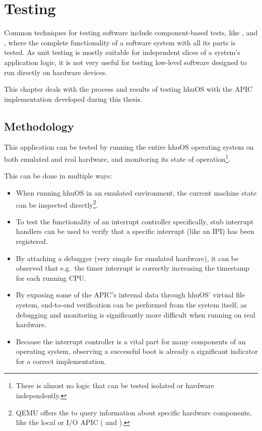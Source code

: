 \chapter{Testing}
\label{ch:verification}

Common techniques for testing software include component-based tests, like , and , where the complete functionality of a software system with all its parts is tested.
As unit testing is mostly suitable for independent slices of a system's application logic, it is not very useful for testing low-level software designed to run directly on hardware devices.

This chapter deals with the process and results of testing hhuOS with the APIC implementation developed during this thesis.

\clearpage

\section{Methodology}
\label{sec:verificationmethods}

This application can be tested by running the entire hhuOS operating system on both emulated and real hardware, and monitoring its state of operation\footnote{
  There is almost no logic that can be tested isolated or hardware independently.}.

This can be done in multiple ways:

\begin{itemize}
  \item When running hhuOS in an emulated environment, the current machine state can be inspected directly\footnote{
          QEMU offers the  to query information about specific hardware components, like the local or I/O APIC ( and ).}.
  \item To test the functionality of an interrupt controller specifically, stub interrupt handlers can be used to verify that a specific interrupt (like an IPI) has been registered.
  \item By attaching a debugger (very simple for emulated hardware), it can be observed that e.g.\ the timer interrupt is correctly increasing the timestamp for each running CPU\@.
  \item By exposing some of the APIC's internal data through hhuOS' virtual file system, end-to-end verification can be performed from the system itself, as debugging and monitoring is significantly more difficult when running on real hardware.
  \item Because the interrupt controller is a vital part for many components of an operating system, observing a successful boot is already a significant indicator for a correct implementation.
\end{itemize}

